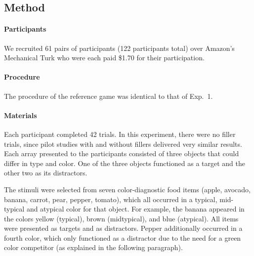 \documentclass[11pt]{article}
\newcommand{\figref}[1]{Figure \ref{#1}}
\begin{document}
\subsection{Method}

\paragraph{Participants}
We recruited 61 pairs of participants (122 participants total) over Amazon's Mechanical Turk who were each paid \$1.70 for their participation. 


\paragraph{Procedure}

The procedure of the reference game was identical to that of Exp.~1. %



\paragraph{Materials}

Each participant completed 42 trials. In this experiment, there were no filler trials, since pilot studies with and without fillers delivered very similar results. Each array presented to the participants consisted of three objects that could differ in type and color. One of the three objects functioned as a target and the other two as its distractors.

The stimuli were selected from seven color-diagnostic food items (apple, avocado, banana, carrot, pear, pepper, tomato), which all occurred in a typical, mid-typical and atypical color for that object. For example, the banana appeared in the colors yellow (typical), brown (midtypical), and blue (atypical). 
All items were presented as targets and as distractors. Pepper additionally occurred in a fourth color, which only functioned as a distractor due to the need for a green color competitor (as explained in the following paragraph). 
\end{document}
